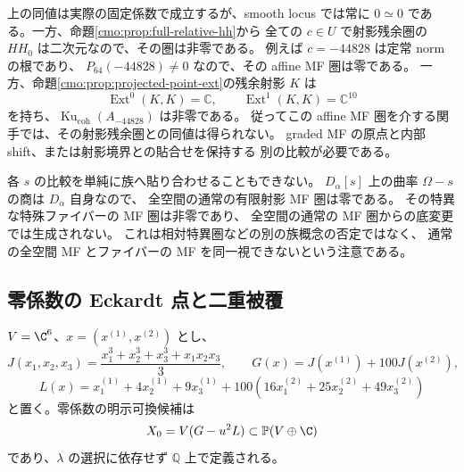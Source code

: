 \begin{remark}[射影残余圏を忘れる具体的な障害]
\label{cmo:rem:affine-mf-forgets-residual}
上の同値は実際の固定係数で成立するが、smooth locus では常に
$0\simeq0$ である。一方、命題\ref{cmo:prop:full-relative-hh}から
全ての $c\in U$ で射影残余圏の $HH_0$ は二次元なので、その圏は非零である。
例えば $c=-44828$ は定常 norm の根であり、
$P_{64}(-44828)\ne0$ なので、その affine MF 圏は零である。
一方、命題\ref{cmo:prop:projected-point-ext}の残余射影 $K$ は
\[
 \operatorname{Ext}^0(K,K)=\mathbb C,
 \qquad \operatorname{Ext}^1(K,K)=\mathbb C^{10}
\]
を持ち、$\operatorname{Ku}_{\mathrm{coh}}(A_{-44828})$ は非零である。
従ってこの affine MF 圏を介する関手では、その射影残余圏との同値は得られない。
graded MF の原点と内部 shift、または射影境界との貼合せを保持する
別の比較が必要である。

各 $s$ の比較を単純に族へ貼り合わせることもできない。
$D_\alpha[s]$ 上の曲率 $\Omega-s$ の商は $D_\alpha$ 自身なので、
全空間の通常の有限射影 MF 圏は零である。
その特異な特殊ファイバーの MF 圏は非零であり、
全空間の通常の MF 圏からの底変更では生成されない。
これは相対特異圏などの別の族概念の否定ではなく、
通常の全空間 MF とファイバーの MF を同一視できないという注意である。
\end{remark}

\subsection{零係数の Eckardt 点と二重被覆}

$V=\C^6$、$x=(x^{(1)},x^{(2)})$ とし、
\[
 J(x_1,x_2,x_3)=\frac{x_1^3+x_2^3+x_3^3+x_1x_2x_3}{3},\qquad
 G(x)=J(x^{(1)})+100J(x^{(2)}),
\]
\[
 L(x)=x^{(1)}_1+4x^{(1)}_2+9x^{(1)}_3
       +100(16x^{(2)}_1+25x^{(2)}_2+49x^{(2)}_3)
\]
と置く。零係数の明示可換候補は
\[
 X_0=V(G-u^2L)\subset\mathbb P(V\oplus\C)
\]
であり、$\lambda$ の選択に依存せず $\mathbb Q$ 上で定義される。

